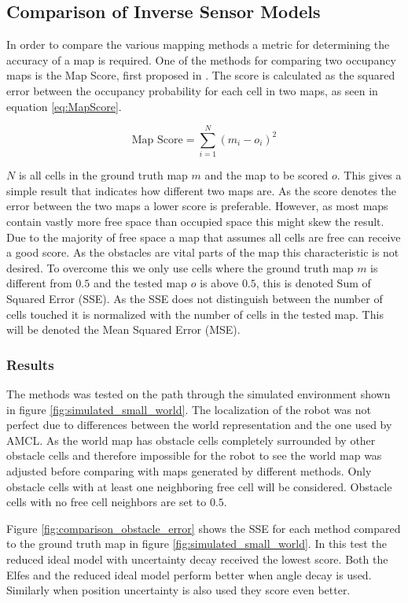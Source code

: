 \subsection{Comparison of Inverse Sensor Models}
In order to compare the various mapping methods a metric for determining the accuracy of a map is required. One of the methods for comparing two occupancy maps is the Map Score, first proposed in \cite{MoravecMartin}. The score is calculated as the squared error between the occupancy probability for each cell in two maps, as seen in equation \ref{eq:MapScore}.

\begin{equation}
\label{eq:MapScore}
\text{Map Score} = \sum_{i=1}^{N} (m_{i} - o_{i})^2
\end{equation}

$N$ is all cells in the ground truth map $m$ and the map to be scored $o$. 
This gives a simple result that indicates how different two maps are. As the score denotes the error between the two maps a lower score is preferable.  
However, as most maps contain vastly more free space than occupied space this might skew the result. 
Due to the majority of free space a map that assumes all cells are free can receive a  good score.
As the obstacles are vital parts of the map this characteristic is not desired. 
To overcome this we only use cells where the ground truth map $m$ is different from \(0.5\) and the tested map $o$ is above \(0.5\), this is denoted Sum of Squared Error (SSE).
As the SSE does not distinguish between the number of cells touched it is normalized with the number of cells in the tested map. This will be denoted the Mean Squared Error (MSE).  

\subsubsection{Results}
The methods was tested on the path through the simulated environment shown in figure \vref{fig:simulated_small_world}. 
The localization of the robot was not perfect due to differences between the world representation and the one used by AMCL.
As the world map has obstacle cells completely surrounded by other obstacle cells and therefore impossible for the robot to see the world map was adjusted before comparing with maps generated by different methods. Only obstacle cells with at least one neighboring free cell will be considered. Obstacle cells with no free cell neighbors are set to $0.5$. 

Figure \vref{fig:comparison_obstacle_error} shows the SSE for each method compared to the ground truth map in figure \vref{fig:simulated_small_world}. 
In this test the reduced ideal model with uncertainty decay received the lowest score. Both the Elfes and the reduced ideal model perform better when angle decay is used.
Similarly when position uncertainty is also used they score even better. 
 
